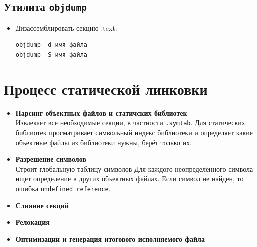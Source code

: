 \documentclass{article}
\begin{document}
\subsection*{Утилита \texttt{objdump}}
\begin{itemize}
\item Дизассемблировать секцию .text:
\begin{lstlisting}[style=csMiptBash]
objdump -d имя-файла
objdump -S имя-файла
\end{lstlisting}
\end{itemize}

\section{Процесс статической линковки}

\begin{itemize}
\item \textbf{Парсинг объектных файлов и статичских библиотек}\\
Извлекает все необходимые секции, в частности \texttt{.symtab}. Для статических библиотек просматривает символьный индекс библиотеки и определяет какие объектные файлы из библиотеки нужны, берёт только их.
\item \textbf{Разрешение символов}\\
Строит глобальную таблицу символов
Для каждого неопределённого символа ищет определение в других объектных файлах.
Если символ не найден, то ошибка \texttt{undefined reference}.

\item \textbf{Слияние секций}\\

\item \textbf{Релокация}\\

\item \textbf{Оптимизации и генерация итогового исполняемого файла}\\

\end{itemize}
\end{document}
